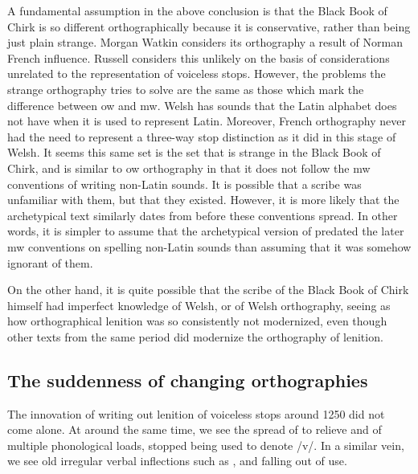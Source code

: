 A fundamental assumption in the above conclusion is that the Black Book of Chirk is so different orthographically because it is conservative, rather than being just plain strange. Morgan Watkin considers its orthography a result of Norman French influence\parencite*{watkin_black_1966}. Russell considers this unlikely on the basis of considerations unrelated to the representation of voiceless stops\parencite*[143--144]{Rus_Scribal95}. However, the problems the strange orthography tries to solve are the same as those which mark the difference between \gls{ow} and \gls{mw}. Welsh has sounds that the Latin alphabet does not have when it is used to represent Latin. Moreover, French orthography never had the need to represent a three-way stop distinction as it did in this stage of Welsh. It seems this same set is the set that is strange in the Black Book of Chirk, and is similar to \gls{ow} orthography in that it does not follow the \gls{mw} conventions of writing non-Latin sounds. It is possible that a scribe was unfamiliar with them, but that they existed. However, it is more likely that the archetypical  text similarly dates from before these conventions spread. In other words, it is simpler to assume that the archetypical version of  predated the later \gls{mw} conventions on spelling non-Latin sounds than assuming that it was somehow ignorant of them.

On the other hand, it is quite possible that the scribe of the Black Book of Chirk himself had imperfect knowledge of Welsh, or of Welsh orthography, seeing as how orthographical lenition was so consistently not modernized, even though other texts from the same period did modernize the orthography of lenition.



\subsection{The suddenness of changing orthographies}

The innovation of writing out lenition of voiceless stops around 1250 did not come alone. At around the same time, we see the spread of  to relieve  and  of multiple phonological loads,  stopped being used to denote /v/. In a similar vein, we see old irregular verbal inflections such as ,  and  falling out of use.


